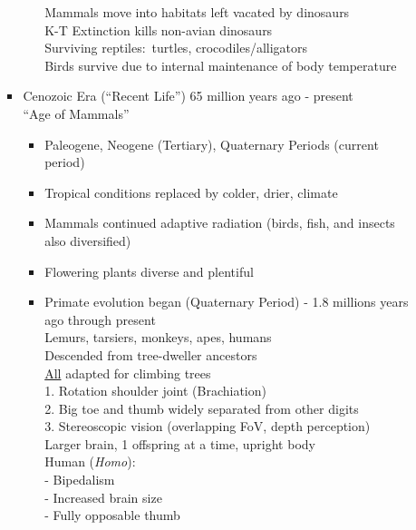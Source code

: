 \documentclass[12pt]{article}
\begin{document}
\begin{itemize}
\begin{itemize}
\begin{itemize}
\begin{itemize}
                    Mammals move into habitats left vacated by dinosaurs \\
                    K-T Extinction kills non-avian dinosaurs \\
                    Surviving reptiles:\ turtles, crocodiles/alligators \\
                    Birds survive due to internal maintenance of body temperature
                \end{itemize}
                \item Cenozoic Era (``Recent Life'') 65 million years ago - present \\
                ``Age of Mammals'' \\
                \begin{itemize}
                    \item Paleogene, Neogene (Tertiary), Quaternary Periods (current period)
                    \item Tropical conditions replaced by colder, drier, climate
                    \item Mammals continued adaptive radiation (birds, fish, and insects also diversified)
                    \item Flowering plants diverse and plentiful
                    \item Primate evolution began (Quaternary Period) - 1.8 millions years ago through present \\
                    Lemurs, tarsiers, monkeys, apes, humans \\
                    Descended from tree-dweller ancestors \\
                    \underline{All} adapted for climbing trees \\
                    1. Rotation shoulder joint (Brachiation) \\
                    2. Big toe and thumb widely separated from other digits \\
                    3. Stereoscopic vision (overlapping FoV, depth perception) \\
                    Larger brain, 1 offspring at a time, upright body \\
                    Human (\textit{Homo}): \\
                    - Bipedalism \\
                    - Increased brain size \\
                    - Fully opposable thumb \\

\end{itemize}
\end{itemize}
\end{itemize}
\end{itemize}
\end{document}

